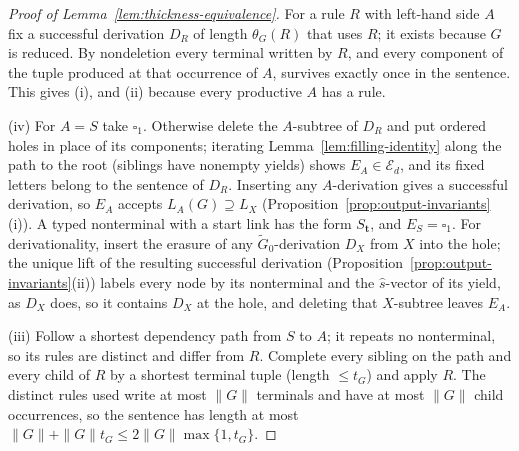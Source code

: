 \documentclass[11pt]{article}
\numberwithin{equation}{section}
\theoremstyle{plain}
\theoremstyle{definition}
\theoremstyle{remark}
\newcommand{\blank}{\square}
\theoremstyle{plain}
\begin{document}
\begin{proof}[Proof of Lemma~\ref{lem:thickness-equivalence}]
For a rule $R$ with left-hand side $A$ fix a successful derivation $D_R$ of
length $\theta_G(R)$ that uses $R$; it exists because $G$ is reduced.  By
nondeletion every terminal written by $R$, and every component of the tuple
produced at that occurrence of $A$, survives exactly once in the sentence.  This
gives (i), and (ii) because every productive $A$ has a rule.

(iv) For $A=S$ take $\blank_1$.  Otherwise delete the $A$-subtree of $D_R$ and
put ordered holes in place of its components; iterating
Lemma~\ref{lem:filling-identity} along the path to the root (siblings have
nonempty yields) shows $E_A\in\mathcal E_d$, and its fixed letters belong to the
sentence of $D_R$.  Inserting any $A$-derivation gives a successful derivation,
so $E_A$ accepts $L_A(G)\supseteq L_X$
(Proposition~\ref{prop:output-invariants}(i)).  A typed nonterminal with a start
link has the form $S_{\mathbf t}$, and $E_S=\blank_1$.  For derivationality,
insert the erasure of any $\widetilde G_0$-derivation $D_X$ from $X$ into the
hole; the unique lift of the resulting successful derivation
(Proposition~\ref{prop:output-invariants}(ii)) labels every node by its
nonterminal and the $\widehat s$-vector of its yield, as $D_X$ does, so it contains
$D_X$ at the hole, and deleting that $X$-subtree leaves $E_A$.

(iii) Follow a shortest dependency path from $S$ to $A$; it repeats no
nonterminal, so its rules are distinct and differ from $R$.  Complete every
sibling on the path and every child of $R$ by a shortest terminal tuple (length
$\le t_G$) and apply $R$.  The distinct rules used write at most $\|G\|$
terminals and have at most $\|G\|$ child occurrences, so the sentence has length
at most $\|G\|+\|G\|t_G\le2\|G\|\max\{1,t_G\}$.
\end{proof}
\end{document}
